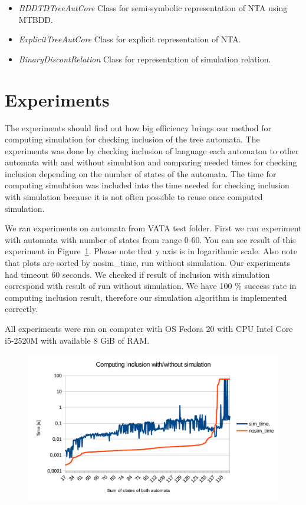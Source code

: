 \documentclass[a4paper, 12pt]{article}
\begin{document}
\begin{itemize}
	\item \emph{BDDTDTreeAutCore} Class for semi-symbolic representation of NTA using MTBDD.
	\item \emph{ExplicitTreeAutCore} Class for explicit representation of NTA.
	\item \emph{BinaryDiscontRelation} Class for representation of simulation relation.
\end{itemize}

\section{Experiments}
\label{sec:exps}

The experiments should find out how big efficiency brings our method for computing simulation for checking inclusion of the tree automata.
The experiments was done by checking inclusion of language each automaton to other automata with and without simulation
and comparing needed times for checking inclusion depending on the number of states of the automata.
The time for computing simulation was included into the time needed for checking inclusion with simulation
because it is not often possible to reuse once computed simulation.

We ran experiments on automata from VATA test folder. First we ran experiment with automata with number of states from range 0-60. You can see result of this experiment in Figure~\ref{fig:g}. Please note that y axis is in logarithmic scale. Also note that plots are sorted by nosim\_time, run without simulation. Our experiments had timeout 60 seconds. We checked if result of inclusion with simulation correspond with result of run without simulation. We have 100 \% success rate in computing inclusion result, therefore our simulation algorithm is implemented correctly.

All experiments were ran on computer with OS Fedora 20 with CPU Intel Core i5-2520M with available 8 GiB of RAM.

\begin{figure}[h!]
	\centering
	\includegraphics{g}
	\caption{}
	\label{fig:g}
\end{figure}
\end{document}
